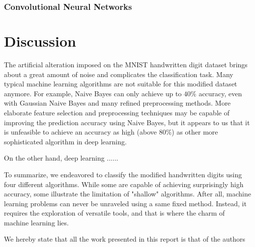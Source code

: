 \documentclass{acm_proc_article-sp}
\begin{document}
\subsubsection{Convolutional Neural Networks}




\section{Discussion}
The artificial alteration imposed on the MNIST handwritten digit dataset brings about a great amount of noise and complicates the classification task. Many typical machine learning algorithms are not suitable for this modified dataset anymore. For example, Naive Bayes can only achieve up to  $40 \%$ accuracy, even with Gaussian Naive Bayes and many refined preprocessing methods.  More elaborate feature selection and preprocessing techniques may be capable of improving the prediction accuracy using Naive Bayes, but it appears to us that it is unfeasible to achieve an accuracy as high (above $80 \%$) as other more sophisticated  algorithm in deep learning.

On the other hand, deep learning ......

To summarize, we endeavored to classify the modified handwritten digits using four different algorithms. While some are capable of  achieving surprisingly high accuracy,  some illustrate the limitation of "shallow" algorithms. After all, machine learning problems can never be unraveled using a same fixed method. Instead, it requires the exploration of versatile tools, and that is where the charm of machine learning lies.


We	hereby	state	that	all	the	work	 presented	in	this	report	is	that	of	the	authors

  
\end{document}
